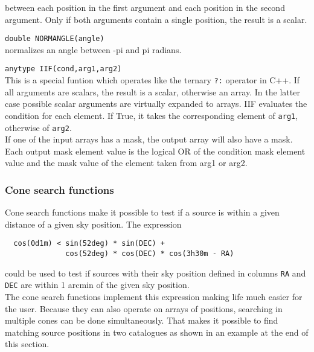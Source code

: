 \begin{description}
    between each position in the first argument and each position in
    the second argument. Only if both arguments contain a single
    position, the result is a scalar.
  \item[] \texttt{double NORMANGLE(angle)}\\
    normalizes an angle between -pi and pi radians.
  \item[] \texttt{anytype IIF(cond,arg1,arg2)}\\
    This is a special funtion which operates like the ternary \texttt{?:}
    operator in C++. 
    If all arguments are scalars, the result is a scalar, otherwise
    an array. In the latter case possible scalar arguments are
    virtually expanded to arrays.
    IIF evaluates the condition for each element. If True, it takes
    the corresponding element of \texttt{arg1}, otherwise of
    \texttt{arg2}.
    \\If one of the input arrays has a mask, the output array will
    also have a mask. Each output mask element value is the logical OR of the
    condition mask element value and the mask value of the element taken
    from arg1 or arg2.
\end{description}

\subsubsection{\label{TAQL:CONESEARCH}Cone search functions}
Cone search functions make it possible to test if a source is
within a given distance of a given sky position. The expression
\begin{verbatim}
  cos(0d1m) < sin(52deg) * sin(DEC) +
              cos(52deg) * cos(DEC) * cos(3h30m - RA)
\end{verbatim}
could be used to test if sources with their sky position defined
in columns \texttt{RA} and \texttt{DEC} are within 1 arcmin of the
given sky position.
\\The cone search functions implement this expression making life much
easier for the user. Because they
can also operate on arrays of positions, searching in
multiple cones can be done simultaneously. That makes it
possible to find matching source positions in two catalogues as shown
in an example at the end of this section.

